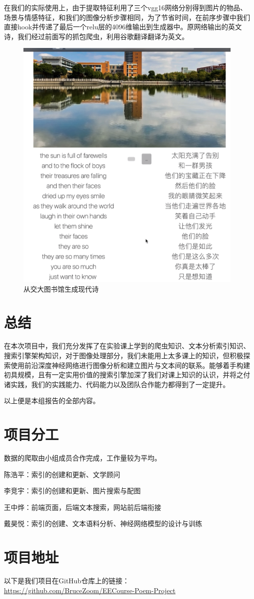 \documentclass[a4paper, 10pt]{article}
\begin{document}
在我们的实际使用上，由于提取特征利用了三个vgg16网络分别得到图片的物品、场景与情感特征，和我们的图像分析步骤相同，为了节省时间，在前序步骤中我们直接hook并传递了最后一个relu层的4096维输出到生成器中。原网络输出的英文诗，我们经过前面写的抓包爬虫，利用谷歌翻译翻译为英文。
\begin{figure}[H]
\centering
\includegraphics[width=0.7\linewidth]{imgs/9.png}
\caption{从交大图书馆生成现代诗}
\end{figure}

\section{总结}
在本次项目中，我们充分发挥了在实验课上学到的爬虫知识、文本分析索引知识、搜索引擎架构知识，对于图像处理部分，我们未能用上太多课上的知识，但积极探索使用前沿深度神经网络进行图像分析和建立图片与文本间的联系。能够着手构建初具规模，且有一定实用价值的搜索引擎加深了我们对课上知识的认识，并将之付诸实践，我们的实践能力、代码能力以及团队合作能力都得到了一定提升。

以上便是本组报告的全部内容。


\begin{appendices}
\section{项目分工}
数据的爬取由小组成员合作完成，工作量较为平均。

陈浩平：索引的创建和更新、文学顾问

李竞宇：索引的创建和更新、图片搜索与配图

王中烨：前端页面，后端文本搜索，网站前后端衔接

戴昊悦：索引的创建、文本语料分析、神经网络模型的设计与训练

\section{项目地址}
以下是我们项目在GitHub仓库上的链接：\href{https://github.com/BruceZoom/EECourse-Poem-Project}{https://github.com/BruceZoom/EECourse-Poem-Project}

\end{appendices}
\end{document}

